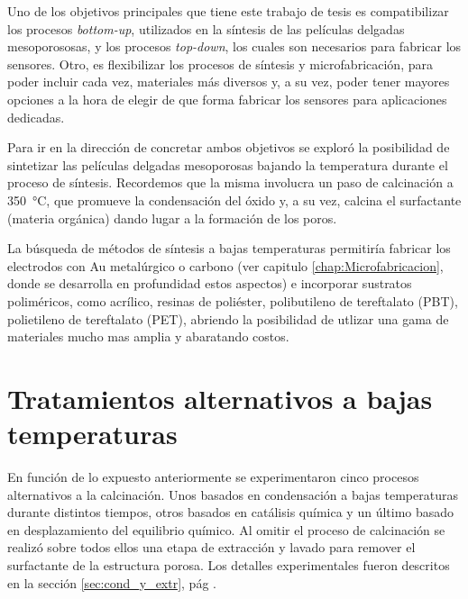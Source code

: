 	Uno de los objetivos principales que tiene este trabajo de tesis es compatibilizar los procesos \textit{bottom-up}, utilizados en la síntesis de las películas delgadas mesoporososas, y los procesos \textit{top-down}, los cuales son necesarios para fabricar los sensores. Otro, es flexibilizar los procesos de síntesis y microfabricación, para poder incluir cada vez, materiales más diversos y, a su vez, poder tener mayores opciones a la hora de elegir de que forma fabricar los sensores para aplicaciones dedicadas\cite{Doshi2000a,Wagner2013,Innocenzi2013,Soler-Illia2002a}.

	Para ir en la dirección de concretar ambos objetivos se exploró la posibilidad de sintetizar las películas delgadas mesoporosas bajando la temperatura durante el proceso de síntesis. Recordemos que la misma involucra un paso de calcinación a \SI{350}{\celsius}, que promueve la condensación del óxido y, a su vez, calcina el surfactante (materia orgánica) dando lugar a la formación de los poros.\cite{Zhang2015,Horiuchi2011,Clark2000,Zhang2005}

	La búsqueda de métodos de síntesis a bajas temperaturas permitiría fabricar los electrodos con Au metalúrgico o carbono (ver capitulo \ref{chap:Microfabricacion}, donde se desarrolla en profundidad estos aspectos) e incorporar sustratos poliméricos, como acrílico, resinas de poliéster, polibutileno de tereftalato (PBT), polietileno de tereftalato (PET), abriendo la posibilidad de utlizar una gama de materiales mucho mas amplia y abaratando costos.

\section{Tratamientos alternativos a bajas temperaturas}
	
		En función de lo expuesto anteriormente se experimentaron cinco procesos alternativos a la calcinación. Unos basados en condensación a bajas temperaturas durante distintos tiempos, otros basados en catálisis química y un último basado en desplazamiento del equilibrio químico. Al omitir el proceso de calcinación se realizó sobre todos ellos una etapa de extracción y lavado para remover el surfactante de la estructura porosa. Los detalles experimentales fueron descritos en la sección \ref{sec:cond_y_extr}, pág \pageref{sec:cond_y_extr}.

